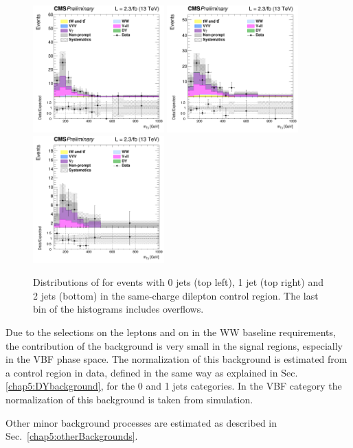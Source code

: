 \begin{figure}[htb]
\centering
\includegraphics[width=0.45\textwidth]{images/13TeV/HighMass/cratio_hww2l2v_13TeV_ss_of0j_mTi_0j.png}
\includegraphics[width=0.45\textwidth]{images/13TeV/HighMass/cratio_hww2l2v_13TeV_ss_of1j_mTi_1j.png}
\includegraphics[width=0.45\textwidth]{images/13TeV/HighMass/cratio_hww2l2v_13TeV_ss_of2j_mTi_VBF.png}
\caption{
Distributions of \mti for events with 0 jets (top left), 1 jet (top right) and 2 jets (bottom) in the same-charge dilepton
control region. The last bin of the histograms includes overflows. %
}
\label{fig:13TeV_hm_samesign}
\end{figure}

Due to the selections on the leptons \pt and on \mll in the WW baseline requirements, the contribution of the \dytt background is very small in the signal regions, especially in the VBF phase space. The normalization of this background is estimated from a control region in data, defined in the same way as explained in Sec.\ref{chap5:DYbackground}, for the 0 and 1 jets categories. In the VBF category the normalization of this background is taken from simulation.

Other minor background processes are estimated as described in Sec.~\ref{chap5:otherBackgrounds}.














